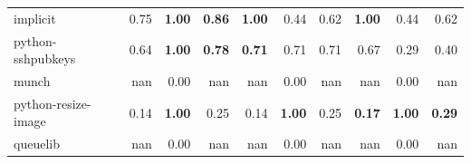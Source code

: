 \documentclass[submit,noauthor,dvipdfmx]{ipsj}
\begin{document}
\begin{table}{}
{\begin{tabular}{l||p{4em}|p{4em}|p{4em}||p{4em}|p{4em}|p{4em}||p{4em}|p{4em}|p{4em}}
            \hline \hline
            implicit & \multicolumn{1}{r|}{0.75} & \multicolumn{1}{r|}{\textbf{1.00}} & \multicolumn{1}{r||}{\textbf{0.86}} & \multicolumn{1}{r|}{\textbf{1.00}} & \multicolumn{1}{r|}{0.44} & \multicolumn{1}{r||}{0.62} & \multicolumn{1}{r|}{\textbf{1.00}} & \multicolumn{1}{r|}{0.44} & \multicolumn{1}{r}{0.62} \\
            python-sshpubkeys & \multicolumn{1}{r|}{0.64} & \multicolumn{1}{r|}{\textbf{1.00}} & \multicolumn{1}{r||}{\textbf{0.78}} & \multicolumn{1}{r|}{\textbf{0.71}} & \multicolumn{1}{r|}{0.71} & \multicolumn{1}{r||}{0.71} & \multicolumn{1}{r|}{0.67} & \multicolumn{1}{r|}{0.29} & \multicolumn{1}{r}{0.40} \\
            munch & \multicolumn{1}{r|}{nan} & \multicolumn{1}{r|}{0.00} & \multicolumn{1}{r||}{nan} & \multicolumn{1}{r|}{nan} & \multicolumn{1}{r|}{0.00} & \multicolumn{1}{r||}{nan} & \multicolumn{1}{r|}{nan} & \multicolumn{1}{r|}{0.00} & \multicolumn{1}{r}{nan} \\
            python-resize-image & \multicolumn{1}{r|}{0.14} & \multicolumn{1}{r|}{\textbf{1.00}} & \multicolumn{1}{r||}{0.25} & \multicolumn{1}{r|}{0.14} & \multicolumn{1}{r|}{\textbf{1.00}} & \multicolumn{1}{r||}{0.25} & \multicolumn{1}{r|}{\textbf{0.17}} & \multicolumn{1}{r|}{\textbf{1.00}} & \multicolumn{1}{r}{\textbf{0.29}} \\
            queuelib & \multicolumn{1}{r|}{nan} & \multicolumn{1}{r|}{0.00} & \multicolumn{1}{r||}{nan} & \multicolumn{1}{r|}{nan} & \multicolumn{1}{r|}{0.00} & \multicolumn{1}{r||}{nan} & \multicolumn{1}{r|}{nan} & \multicolumn{1}{r|}{0.00} & \multicolumn{1}{r}{nan} \\ \hline
        \end{tabular}
    }
\end{table}
\end{document}
